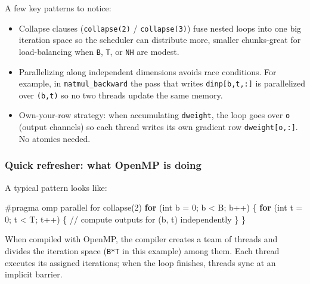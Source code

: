 \documentclass[
  letterpaper,
  DIV=11,
  numbers=noendperiod]{scrreprt}
\newenvironment{Shaded}{\begin{snugshade}}{\end{snugshade}}
\newcommand{\CommentTok}[1]{\textcolor[rgb]{0.37,0.37,0.37}{#1}}
\newcommand{\ControlFlowTok}[1]{\textcolor[rgb]{0.00,0.23,0.31}{\textbf{#1}}}
\newcommand{\DataTypeTok}[1]{\textcolor[rgb]{0.68,0.00,0.00}{#1}}
\newcommand{\DecValTok}[1]{\textcolor[rgb]{0.68,0.00,0.00}{#1}}
\newcommand{\NormalTok}[1]{\textcolor[rgb]{0.00,0.23,0.31}{#1}}
\newcommand{\OperatorTok}[1]{\textcolor[rgb]{0.37,0.37,0.37}{#1}}
\newcommand{\PreprocessorTok}[1]{\textcolor[rgb]{0.68,0.00,0.00}{#1}}
\providecommand{\tightlist}{%
  \setlength{\itemsep}{0pt}\setlength{\parskip}{0pt}}
\begin{document}
A few key patterns to notice:

\begin{itemize}
\tightlist
\item
  Collapse clauses (\texttt{collapse(2)} / \texttt{collapse(3)}) fuse
  nested loops into one big iteration space so the scheduler can
  distribute more, smaller chunks-great for load-balancing when
  \texttt{B}, \texttt{T}, or \texttt{NH} are modest.
\item
  Parallelizing along independent dimensions avoids race conditions. For
  example, in \texttt{matmul\_backward} the pass that writes
  \texttt{dinp{[}b,t,:{]}} is parallelized over \texttt{(b,t)} so no two
  threads update the same memory.
\item
  Own-your-row strategy: when accumulating \texttt{dweight}, the loop
  goes over \texttt{o} (output channels) so each thread writes its own
  gradient row \texttt{dweight{[}o,:{]}}. No atomics needed.
\end{itemize}

\subsubsection{Quick refresher: what OpenMP is
doing}\label{quick-refresher-what-openmp-is-doing}

A typical pattern looks like:

\begin{Shaded}
\begin{Highlighting}[]
\PreprocessorTok{\#pragma omp parallel for collapse(2)}
\ControlFlowTok{for} \OperatorTok{(}\DataTypeTok{int}\NormalTok{ b }\OperatorTok{=} \DecValTok{0}\OperatorTok{;}\NormalTok{ b }\OperatorTok{\textless{}}\NormalTok{ B}\OperatorTok{;}\NormalTok{ b}\OperatorTok{++)} \OperatorTok{\{}
    \ControlFlowTok{for} \OperatorTok{(}\DataTypeTok{int}\NormalTok{ t }\OperatorTok{=} \DecValTok{0}\OperatorTok{;}\NormalTok{ t }\OperatorTok{\textless{}}\NormalTok{ T}\OperatorTok{;}\NormalTok{ t}\OperatorTok{++)} \OperatorTok{\{}
        \CommentTok{// compute outputs for (b, t) independently}
    \OperatorTok{\}}
\OperatorTok{\}}
\end{Highlighting}
\end{Shaded}

When compiled with OpenMP, the compiler creates a team of threads and
divides the iteration space (\texttt{B*T} in this example) among them.
Each thread executes its assigned iterations; when the loop finishes,
threads sync at an implicit barrier.
\end{document}
